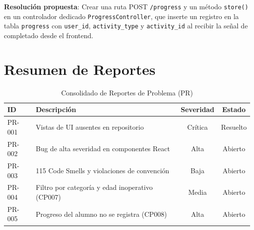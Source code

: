 \documentclass[12pt]{article}
\begin{document}
\begin{sloppypar}
\textbf{Resolución propuesta}: Crear una ruta POST \texttt{/progress} y un método
\texttt{store()} en un controlador dedicado \texttt{ProgressController}, que inserte
un registro en la tabla \texttt{progress} con \texttt{user\_id}, \texttt{activity\_type}
y \texttt{activity\_id} al recibir la señal de completado desde el frontend.
\end{sloppypar}

\section*{Resumen de Reportes}

\begin{table}[H]
\centering
\caption{Consolidado de Reportes de Problema (PR)}
\begin{tabularx}{\textwidth}{lXcc}
\toprule
\textbf{ID} & \textbf{Descripción} & \textbf{Severidad} & \textbf{Estado} \\
\midrule
PR-001 & Vistas de UI ausentes en repositorio           & Crítica & Resuelto \\
PR-002 & Bug de alta severidad en componentes React     & Alta    & Abierto  \\
PR-003 & 115 Code Smells y violaciones de convención    & Baja    & Abierto  \\
PR-004 & Filtro por categoría y edad inoperativo (CP007)& Media   & Abierto  \\
PR-005 & Progreso del alumno no se registra (CP008)     & Alta    & Abierto  \\
\bottomrule
\end{tabularx}
\end{table}
\end{document}

